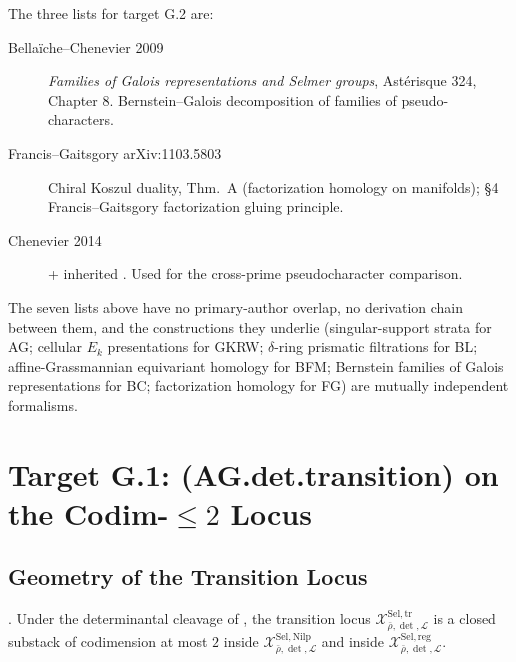 The three lists for target G.2 are:
\begin{description}
\item[Bella\"iche--Chenevier 2009] \emph{Families of Galois
representations and Selmer groups}, Ast\'erisque 324, Chapter 8.
Bernstein--Galois decomposition of families of pseudo-characters.
\item[Francis--Gaitsgory arXiv:1103.5803] Chiral Koszul duality,
Thm.~A (factorization homology on manifolds); \S 4 Francis--Gaitsgory
factorization gluing principle.
\item[Chenevier 2014] + inherited
. Used for the cross-prime
pseudocharacter comparison.
\end{description}

The seven lists above have no primary-author
overlap, no derivation chain between them, and the constructions
they underlie (singular-support strata for AG; cellular \(E_{k}\)
presentations for GKRW; \(\delta\)-ring prismatic filtrations for BL;
affine-Grassmannian equivariant homology for BFM; Bernstein
families of Galois representations for BC; factorization homology
for FG) are mutually independent formalisms.

\section{Target G.1: (AG.det.transition) on the Codim-\(\leq 2\) Locus}
\label{v4-arith:w6-g:agdet-transition}

\subsection{Geometry of the Transition Locus}

\begin{proposition}
\label{v4-arith:w6-g:prop:codim-2}
\ClaimStatusProvedHere. Under the determinantal cleavage of
, the transition locus
\(\mathcal{X}^{\mathrm{Sel},\mathrm{tr}}_{\bar\rho,\det,\mathcal{L}}\)
is a closed substack of codimension at most \(2\) inside
\(\mathcal{X}^{\mathrm{Sel},\mathrm{Nilp}}_{\bar\rho,\det,\mathcal{L}}\)
and inside
\(\mathcal{X}^{\mathrm{Sel},\mathrm{reg}}_{\bar\rho,\det,\mathcal{L}}\).
\end{proposition}

